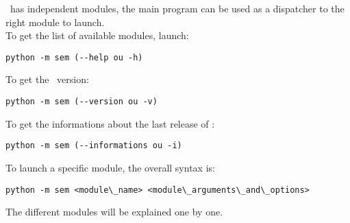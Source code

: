 \documentclass[manual-fr.tex]{subfiles}
\begin{document}
\SEM\ has independent modules, the main program can be used as a dispatcher to the right module to launch.\\

To get the list of available modules, launch:

\begin{lstlisting}[style=pieceofcode,frame=single]
python -m sem (--help ou -h)
\end{lstlisting}

To get the \SEM\ version:

\begin{lstlisting}[style=pieceofcode,frame=single]
python -m sem (--version ou -v)
\end{lstlisting}

To get the informations about the last release of \SEM:

\begin{lstlisting}[style=pieceofcode,frame=single]
python -m sem (--informations ou -i)
\end{lstlisting}

To launch a specific module, the overall syntax is:

\begin{lstlisting}[style=pieceofcode,frame=single]
python -m sem <module\_name> <module\_arguments\_and\_options>
\end{lstlisting}

The different modules will be explained one by one.
\end{document}
